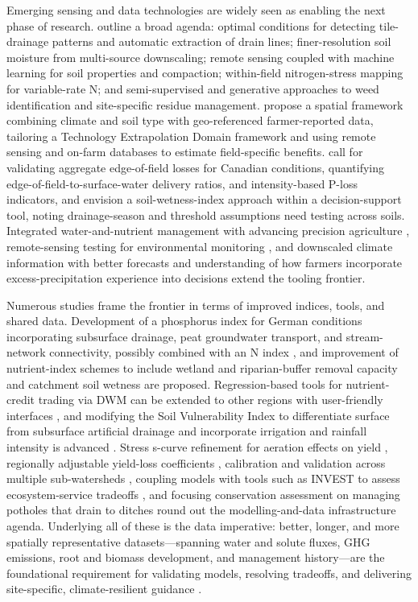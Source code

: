 \documentclass[11pt]{article}
\begin{document}
Emerging sensing and data technologies are widely seen as enabling the next phase of research. \textcite{Khanal2020} outline a broad agenda: optimal conditions for detecting tile-drainage patterns and automatic extraction of drain lines; finer-resolution soil moisture from multi-source downscaling; remote sensing coupled with machine learning for soil properties and compaction; within-field nitrogen-stress mapping for variable-rate N; and semi-supervised and generative approaches to weed identification and site-specific residue management. \textcite{Cassman2025} propose a spatial framework combining climate and soil type with geo-referenced farmer-reported data, tailoring a Technology Extrapolation Domain framework and using remote sensing and on-farm databases to estimate field-specific benefits. \textcite{Reid2018} call for validating aggregate edge-of-field losses for Canadian conditions, quantifying edge-of-field-to-surface-water delivery ratios, and intensity-based P-loss indicators, and \textcite{Julien2023} envision a soil-wetness-index approach within a decision-support tool, noting drainage-season and threshold assumptions need testing across soils. Integrated water-and-nutrient management with advancing precision agriculture \parencite{Jung2024}, remote-sensing testing for environmental monitoring \parencite{Fontes2019}, and downscaled climate information with better forecasts and understanding of how farmers incorporate excess-precipitation experience into decisions \parencite{Morton2015} extend the tooling frontier.

Numerous studies frame the frontier in terms of improved indices, tools, and shared data. Development of a phosphorus index for German conditions incorporating subsurface drainage, peat groundwater transport, and stream-network connectivity, possibly combined with an N index \parencite{Buczko2007}, and improvement of nutrient-index schemes to include wetland and riparian-buffer removal capacity and catchment soil wetness \parencite{Pärn2012} are proposed. Regression-based tools for nutrient-credit trading via DWM can be extended to other regions with user-friendly interfaces \parencite{Negm2016}, and modifying the Soil Vulnerability Index to differentiate surface from subsurface artificial drainage and incorporate irrigation and rainfall intensity is advanced \parencite{Baffaut2020}. Stress s-curve refinement for aeration effects on yield \parencite{Wang2016}, regionally adjustable yield-loss coefficients \parencite{ROBINSON1992}, calibration and validation across multiple sub-watersheds \parencite{Singh2023}, coupling models with tools such as INVEST to assess ecosystem-service tradeoffs \parencite{McLellan2015}, and focusing conservation assessment on managing potholes that drain to ditches \parencite{Smith2008} round out the modelling-and-data infrastructure agenda. Underlying all of these is the data imperative: better, longer, and more spatially representative datasets---spanning water and solute fluxes, GHG emissions, root and biomass development, and management history---are the foundational requirement for validating models, resolving tradeoffs, and delivering site-specific, climate-resilient guidance \parencite{Ma2025,SKAGGS1994,Deng2011}.
\end{document}
